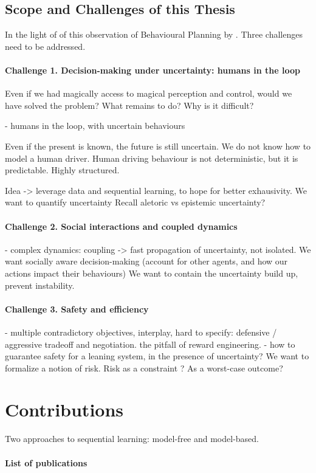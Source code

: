 \subsection{Scope and Challenges of this Thesis}

In the light of of this observation of Behavioural Planning by .
Three challenges need to be addressed.

\paragraph{Challenge 1. Decision-making under uncertainty: humans in the loop}
Even if we had magically access to magical perception and control, would we have solved the problem? What remains to do?
Why is it difficult?

- humans in the loop, with uncertain behaviours

Even if the present is known, the future is still uncertain.
We do not know how to model a human driver.
Human driving behaviour is not deterministic, but it is predictable. Highly structured.

Idea -> leverage data and sequential learning, to hope for better exhausivity.
We want to quantify uncertainty
Recall aletoric vs epistemic uncertainty?

\paragraph{Challenge 2. Social interactions and coupled dynamics}
- complex dynamics: coupling -> fast propagation of uncertainty, not isolated.
We want socially aware decision-making (account for other agents, and how our actions impact their behaviours)
We want to contain the uncertainty build up, prevent instability.

\paragraph{Challenge 3. Safety and efficiency}
- multiple contradictory objectives, interplay, hard to specify: defensive / aggressive tradeoff and negotiation.
the pitfall of reward engineering.
- how to guarantee safety for a leaning system, in the presence of uncertainty?
We want to formalize a notion of risk. Risk as a constraint ? As a worst-case outcome?

\section{Contributions}

Two approaches to sequential learning: model-free and model-based.

\paragraph{List of publications}